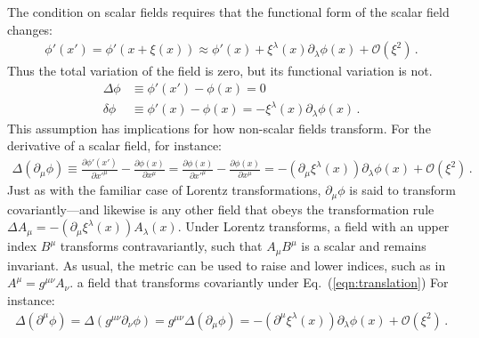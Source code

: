 \documentclass[prd,preprint,
  showpacs,showkeys,lengthcheck,
  nofootinbib,tightenlines,onecolumn,notitlepage,
  preprintnumbers,superscriptaddress]{revtex4-1}
\newcommand{\dx}{\ensuremath{\xi}}
\begin{document}
The condition on scalar fields requires that the functional form of the scalar field changes:
\begin{align}
  \phi'(x')
  =
  \phi'(x + \dx(x))
  \approx
  \phi'(x)
  +
  \dx^\lambda(x) \partial_\lambda \phi(x)
  +
  \mathcal{O}(\dx^2)
  \,.
\end{align}
Thus the total variation of the field is zero, but its functional variation is not.
\begin{subequations}
  \begin{align}
    \Delta \phi
    & \equiv
    \phi'(x')
    -
    \phi(x)
    =
    0
    \\
    \delta \phi
    & \equiv
    \phi'(x)
    -
    \phi(x)
    =
    - \dx^\lambda(x) \partial_\lambda \phi(x)
    \,.
  \end{align}
\end{subequations}
This assumption has implications for how non-scalar fields transform.
For the derivative of a scalar field, for instance:
\begin{align}
  \Delta (\partial_\mu \phi)
  \equiv
  \frac{\partial \phi'(x')}{\partial x'^\mu}
  -
  \frac{\partial \phi(x)}{\partial x^\mu}
  =
  \frac{\partial \phi(x)}{\partial x'^\mu}
  -
  \frac{\partial \phi(x)}{\partial x^\mu}
  =
  -(\partial_\mu \dx^\lambda(x)) \partial_\lambda \phi(x)
  +
  \mathcal{O}(\dx^2)
  \,.
\end{align}
Just as with the familiar case of Lorentz transformations,
$\partial_\mu\phi$
is said to transform covariantly---and likewise is any other field
that obeys the transformation rule $\Delta A_\mu = -(\partial_\mu\dx^\lambda(x))A_\lambda(x)$.
Under Lorentz transforms, a field with an upper index $B^\mu$
transforms contravariantly,
such that $A_\mu B^\mu$ is a scalar and remains invariant.
As usual, the metric can be used to raise and lower indices,
such as in $A^\mu = g^{\mu\nu}A_\nu$.
a field that transforms covariantly under Eq.~(\ref{eqn:translation})
For instance:
\begin{align*}
  \Delta (\partial^\mu \phi)
  =
  \Delta (g^{\mu\nu} \partial_\nu \phi)
  =
  g^{\mu\nu} \Delta( \partial_\mu \phi)
  =
  - (\partial^\mu \dx^\lambda(x)) \partial_\lambda \phi(x)
  +
  \mathcal{O}(\dx^2)
  \,.
\end{align*}
\end{document}
